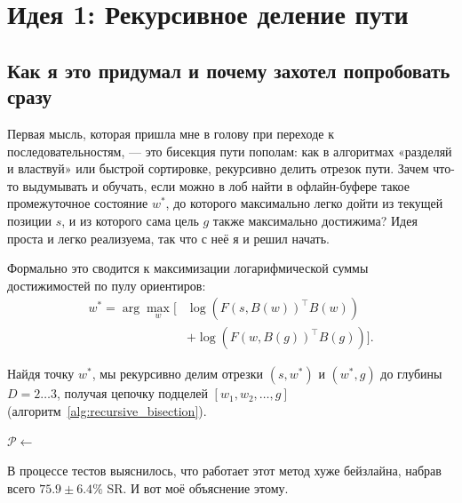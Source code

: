 \section{Идея 1: Рекурсивное деление пути}

\subsection{Как я это придумал и почему захотел попробовать сразу}

Первая мысль, которая пришла мне в голову при переходе к последовательностям, --- это бисекция пути пополам: как в алгоритмах «разделяй и властвуй» или быстрой сортировке, рекурсивно делить отрезок пути. Зачем что-то выдумывать и обучать, если можно в лоб найти в офлайн-буфере такое промежуточное состояние $w^*$, до которого максимально легко дойти из текущей позиции $s$, и из которого сама цель $g$ также максимально достижима? Идея проста и легко реализуема, так что с неё я и решил начать.

Формально это сводится к максимизации логарифмической суммы достижимостей по пулу ориентиров:
\begin{equation}
\label{eq:recursive_bisection_objective}
\begin{split}
    w^* = \arg\max_{w} \big[ &\log(F(s, B(w))^\top B(w)) \\
    &+ \log(F(w, B(g))^\top B(g)) \big].
\end{split}
\end{equation}

Найдя точку $w^*$, мы рекурсивно делим отрезки $(s, w^*)$ и $(w^*, g)$ до глубины $D=2\dots3$, получая цепочку подцелей $[w_1, w_2, \dots, g]$ (алгоритм~\ref{alg:recursive_bisection}).

\begin{algorithm}[t]
\SetAlgoLined
{}
\BlankLine
{}
$\mathcal{P} \leftarrow$ \;
\caption{Рекурсивная бисекция}
\label{alg:recursive_bisection}
\end{algorithm}

В процессе тестов выяснилось, что работает этот метод хуже бейзлайна, набрав всего $75.9 \pm 6.4\%$ SR. И вот моё объяснение этому.

